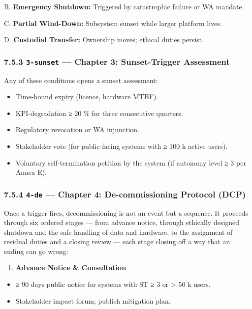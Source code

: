 \documentclass[11pt]{article}
\begin{document}
B. \textbf{Emergency Shutdown:} Triggered by catastrophic failure or WA mandate.

C. \textbf{Partial Wind-Down:} Subsystem sunset while larger platform lives.

D. \textbf{Custodial Transfer:} Ownership moves; ethical duties persist.


\subsubsection*{7.5.3 \texttt{3-sunset} — Chapter 3: Sunset-Trigger Assessment}


Any of these conditions opens a sunset assessment:


\begin{itemize}\setlength\itemsep{0pt}
\item Time-bound expiry (licence, hardware MTBF).
\item KPI-degradation ≥ 20 \% for three consecutive quarters.
\item Regulatory revocation or WA injunction.
\item Stakeholder vote (for public-facing systems with ≥ 100 k active users).
\item Voluntary self-termination petition by the system (if autonomy level ≥ 3 per Annex E).
\end{itemize}


\subsubsection*{7.5.4 \texttt{4-de} — Chapter 4: De-commissioning Protocol (DCP)}


Once a trigger fires, decommissioning is not an event but a sequence. It proceeds through six ordered stages — from advance notice, through ethically designed shutdown and the safe handling of data and hardware, to the assignment of residual duties and a closing review — each stage closing off a way that an ending can go wrong:


\begin{enumerate}\setlength\itemsep{0pt}
\item \textbf{Advance Notice \& Consultation}
\end{enumerate}

\begin{itemize}\setlength\itemsep{0pt}
\item ≥ 90 days public notice for systems with ST ≥ 3 or > 50 k users.
\item Stakeholder impact forum; publish mitigation plan.
\end{itemize}
\end{document}
